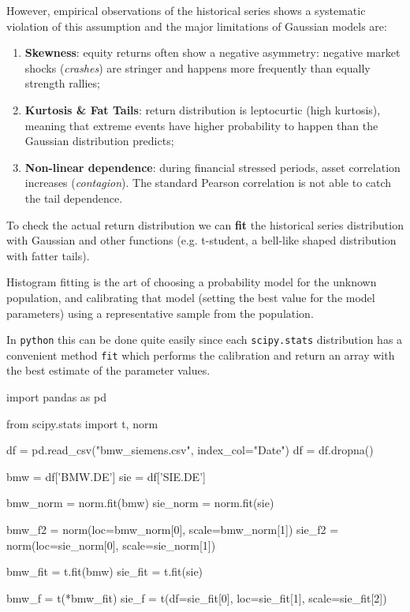 However, empirical observations of the historical series shows a systematic violation of this assumption and the major limitations of Gaussian models are:
\begin{enumerate}
	\item \textbf{Skewness}: equity returns often show a negative asymmetry: negative market shocks (\textit{crashes}) are stringer and happens more frequently than equally strength rallies;
	\item \textbf{Kurtosis \& Fat Tails}: return distribution is leptocurtic (high kurtosis), meaning that extreme events have higher probability to happen than the Gaussian distribution predicts;
	\item \textbf{Non-linear dependence}: during financial stressed periods, asset correlation increases (\textit{contagion}). The standard Pearson correlation is not able to catch the tail dependence.
\end{enumerate}

To check the actual return distribution we can \textbf{fit} the historical series distribution with Gaussian and other functions (e.g. t-student, a bell-like shaped distribution with fatter tails).

\begin{finmarkets}
	\label{sec:how_to_fit}
	Histogram fitting is the art of choosing a probability model for the unknown population, and calibrating that model (setting the best value for the model parameters) using a representative sample from the population.
	
	In \texttt{python} this can be done quite easily since each \texttt{scipy.stats} distribution has a convenient method \texttt{fit} which performs the calibration and return an array with the best estimate of the parameter values.
\end{finmarkets}

\begin{ipythonnon}
import pandas as pd

from scipy.stats import t, norm

df = pd.read_csv("bmw_siemens.csv", index_col="Date")
df = df.dropna()

bmw = df['BMW.DE']
sie = df['SIE.DE']

bmw_norm = norm.fit(bmw)
sie_norm = norm.fit(sie)

bmw_f2 = norm(loc=bmw_norm[0], scale=bmw_norm[1])
sie_f2 = norm(loc=sie_norm[0], scale=sie_norm[1])

bmw_fit = t.fit(bmw)
sie_fit = t.fit(sie)

bmw_f = t(*bmw_fit)
sie_f = t(df=sie_fit[0], loc=sie_fit[1], scale=sie_fit[2])
\end{ipythonnon}

